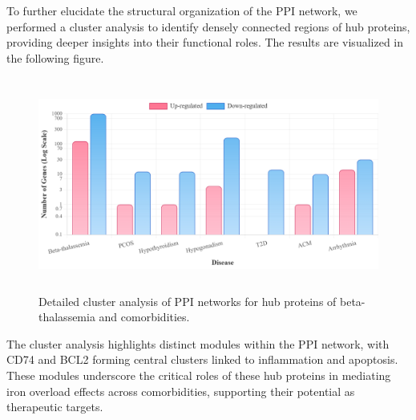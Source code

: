 To further elucidate the structural organization of the PPI network, we performed a cluster analysis to identify densely connected regions of hub proteins, providing deeper insights into their functional roles. The results are visualized in the following figure.

\begin{figure}[H]
    \centering
    \includegraphics[height=7cm]{./fig/fig4_17_2.png}
    \centering
    \caption{Detailed cluster analysis of PPI networks for hub proteins of beta-thalassemia and comorbidities.}
    \label{fig:ppi_cluster_analysis}
\end{figure}

The cluster analysis highlights distinct modules within the PPI network, with CD74 and BCL2 forming central clusters linked to inflammation and apoptosis. These modules underscore the critical roles of these hub proteins in mediating iron overload effects across comorbidities, supporting their potential as therapeutic targets. 

